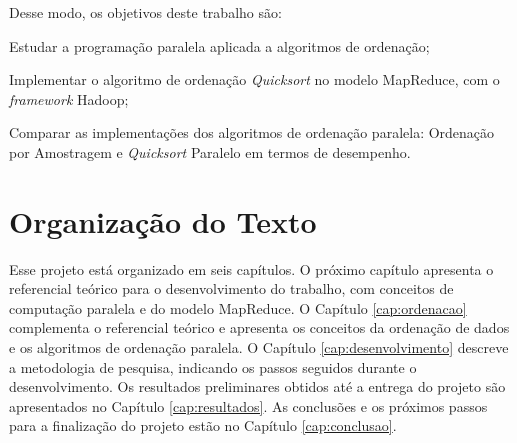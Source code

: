 Desse modo, os objetivos deste trabalho são:

\begin{packed_enum}
\item Estudar a programação paralela aplicada a algoritmos de ordenação;
\item Implementar o algoritmo de ordenação  \textit{Quicksort} no modelo MapReduce, com o \textit{framework} Hadoop;
\item Comparar as implementações dos algoritmos de ordenação paralela: Ordenação por Amostragem e \textit{Quicksort} Paralelo em termos de desempenho.
\end{packed_enum}


\section{Organização do Texto}

Esse projeto está organizado em seis capítulos. O próximo capítulo apresenta o referencial teórico para o desenvolvimento do trabalho, com conceitos de computação paralela  e do modelo MapReduce.
O Capítulo \ref{cap:ordenacao} complementa o referencial teórico e apresenta os conceitos da ordenação de dados e os algoritmos de ordenação paralela.
O Capítulo \ref{cap:desenvolvimento} descreve a metodologia de pesquisa, indicando os passos seguidos durante o desenvolvimento. Os resultados preliminares obtidos até a entrega do projeto são apresentados no Capítulo \ref{cap:resultados}. As conclusões e os próximos passos para a finalização do projeto estão no Capítulo \ref{cap:conclusao}.




